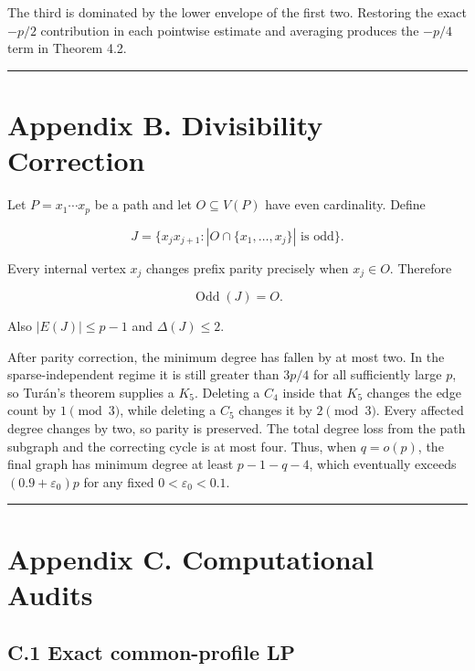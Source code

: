 \documentclass[
  11pt,
]{article}
\begin{document}
The third is dominated by the lower envelope of the first two. Restoring the exact \(-p/2\) contribution in each pointwise estimate and averaging produces the \(-p/4\) term in Theorem 4.2.

\begin{center}\rule{0.5\linewidth}{0.5pt}\end{center}

\section{Appendix B. Divisibility Correction}\label{appendix-b.-divisibility-correction}

Let \(P=x_1\cdots x_p\) be a path and let \(O\subseteq V(P)\) have even cardinality. Define

\[
J=\{x_jx_{j+1}:|O\cap\{x_1,\ldots,x_j\}|\text{ is odd}\}.
\]

Every internal vertex \(x_j\) changes prefix parity precisely when \(x_j\in O\). Therefore

\[
\operatorname{Odd}(J)=O.
\]

Also \(|E(J)|\le p-1\) and \(\Delta(J)\le2\).

After parity correction, the minimum degree has fallen by at most two. In the sparse-independent regime it is still greater than \(3p/4\) for all sufficiently large \(p\), so Turán's theorem supplies a \(K_5\). Deleting a \(C_4\) inside that \(K_5\) changes the edge count by \(1\pmod3\), while deleting a \(C_5\) changes it by \(2\pmod3\). Every affected degree changes by two, so parity is preserved. The total degree loss from the path subgraph and the correcting cycle is at most four. Thus, when \(q=o(p)\), the final graph has minimum degree at least \(p-1-q-4\), which eventually exceeds \((0.9+\varepsilon_0)p\) for any fixed \(0<\varepsilon_0<0.1\).

\begin{center}\rule{0.5\linewidth}{0.5pt}\end{center}

\section{Appendix C. Computational Audits}\label{appendix-c.-computational-audits}

\subsection{C.1 Exact common-profile LP}\label{c.1-exact-common-profile-lp}
\end{document}

